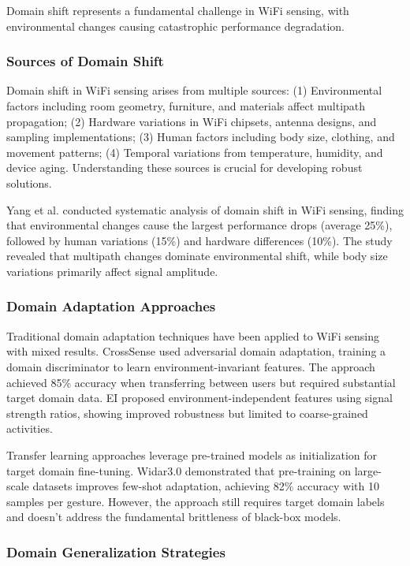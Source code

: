 \documentclass[10pt,journal,compsoc]{IEEEtran}
\begin{document}
Domain shift represents a fundamental challenge in WiFi sensing, with environmental changes causing catastrophic performance degradation.

\subsubsection{Sources of Domain Shift}

Domain shift in WiFi sensing arises from multiple sources: (1) Environmental factors including room geometry, furniture, and materials affect multipath propagation; (2) Hardware variations in WiFi chipsets, antenna designs, and sampling implementations; (3) Human factors including body size, clothing, and movement patterns; (4) Temporal variations from temperature, humidity, and device aging. Understanding these sources is crucial for developing robust solutions.

Yang et al. \cite{yang2022domain} conducted systematic analysis of domain shift in WiFi sensing, finding that environmental changes cause the largest performance drops (average 25\%), followed by human variations (15\%) and hardware differences (10\%). The study revealed that multipath changes dominate environmental shift, while body size variations primarily affect signal amplitude.

\subsubsection{Domain Adaptation Approaches}

Traditional domain adaptation techniques have been applied to WiFi sensing with mixed results. CrossSense \cite{crosssense2018} used adversarial domain adaptation, training a domain discriminator to learn environment-invariant features. The approach achieved 85\% accuracy when transferring between users but required substantial target domain data. EI \cite{ei2020} proposed environment-independent features using signal strength ratios, showing improved robustness but limited to coarse-grained activities.

Transfer learning approaches leverage pre-trained models as initialization for target domain fine-tuning. Widar3.0 \cite{widar3} demonstrated that pre-training on large-scale datasets improves few-shot adaptation, achieving 82\% accuracy with 10 samples per gesture. However, the approach still requires target domain labels and doesn't address the fundamental brittleness of black-box models.

\subsubsection{Domain Generalization Strategies}
\end{document}
